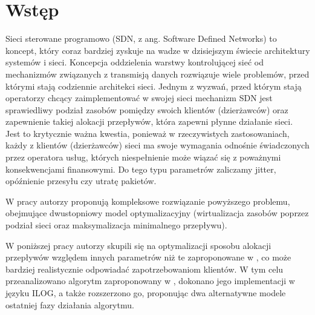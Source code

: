 \section{Wstęp}

Sieci sterowane programowo (SDN, z ang. Software Defined Networks) to koncept, który coraz bardziej zyskuje na wadze w dzisiejszym świecie architektury systemów i sieci. Koncepcja oddzielenia warstwy kontrolującej sieć od mechanizmów związanych z transmisją danych rozwiązuje wiele problemów, przed którymi stają codziennie architekci sieci. Jednym z wyzwań, przed którym stają operatorzy chcący zaimplementować w swojej sieci mechanizm SDN jest sprawiedliwy podział zasobów pomiędzy swoich klientów (dzierżawców) oraz zapewnienie takiej alokacji przepływów, która zapewni płynne działanie sieci. Jest to krytycznie ważna kwestia, ponieważ w rzeczywistych zastosowaniach, każdy z klientów (dzierżawców) sieci ma swoje wymagania odnośnie świadczonych przez operatora usług, których niespełnienie może wiązać się z poważnymi konsekwencjami finansowymi. Do tego typu parametrów zaliczamy jitter, opóźnienie przesyłu czy utratę pakietów. \newline

\noindent W pracy \cite{lin16} autorzy proponują kompleksowe rozwiązanie powyższego problemu, obejmujące dwustopniowy model optymalizacyjny (wirtualizacja zasobów poprzez podział sieci oraz maksymalizacja minimalnego przepływu).  \newline

\noindent W poniższej pracy autorzy skupili się na optymalizacji sposobu alokacji przepływów względem innych parametrów niż te zaproponowane w \cite{lin16}, co może bardziej realistycznie odpowiadać zapotrzebowaniom klientów. W tym celu przeanalizowano algorytm zaproponowany w \cite{lin16}, dokonano jego implementacji w języku ILOG, a także rozszerzono go, proponując dwa alternatywne modele ostatniej fazy działania algorytmu.
